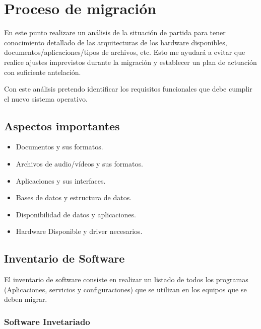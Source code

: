 \chapter{Proceso de migración}\label{ch:migración}

	En este punto realizare un análisis de la situación de partida para tener conocimiento detallado de las arquitecturas de los hardware disponibles, documentos/aplicaciones/tipos de archivos, etc. Esto me ayudará a evitar que realice ajustes imprevistos durante la migración y establecer un plan de actuación con suficiente antelación.
	
	Con este análisis pretendo identificar los requisitos funcionales que debe cumplir el nuevo sistema operativo.
	
	\section{Aspectos importantes}
	
		\begin{itemize}
			
			\item Documentos y sus formatos.
			\item Archivos de audio/vídeos y sus formatos.
			\item Aplicaciones y sus interfaces.
			\item Bases de datos y estructura de datos.
			\item Disponibilidad de datos y aplicaciones.
			\item Hardware Disponible y driver necesarios.
			
		\end{itemize}
	
		\vspace{0.3cm}
		
	\section{Inventario de Software}
		
		El inventario de software consiste en realizar un listado de todos los programas (Aplicaciones, servicios y configuraciones) que se utilizan en los equipos que se deben migrar.\par
		
		\vspace{0.3cm}
		
		\subsection{Software Invetariado}
			
